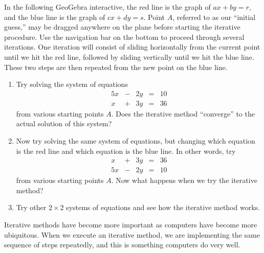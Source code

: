 \documentclass{ximera}
\begin{document}
\begin{exploration}\label{exp:gauss-seidel2x2}
In the following GeoGebra interactive, the red line is the graph of $ax+by=r$, and the blue line is the graph of $cx+dy=s$.  Point $A$, referred to as our ``initial guess,'' may be dragged anywhere on the plane before starting the iterative procedure.  Use the navigation bar on the bottom to proceed through several iterations.  One iteration will consist of sliding horizontally from the current point until we hit the red line, followed by sliding vertically until we hit the blue line.  These two steps are then repeated from the new point on the blue line.
    
    \begin{center}
\end{center}

    \begin{enumerate}
        \item Try solving the system of equations
\begin{equation}\label{eq:diagdom1}
\begin{array}{ccccc}
      5x& -&2y&=&10\\
      x & +&3y&= &36 
    \end{array}
\end{equation}
from various starting points $A$.  Does the iterative method ``converge'' to the actual solution of this system?
        \item Now try solving the same system of equations, but changing which equation is the red line and which equation is the blue line.  In other words, try
\begin{equation}\label{eq:diagdom2}
\begin{array}{ccccc}
      x & +&3y&= &36  \\
     5x& -&2y&=&10
    \end{array}
\end{equation}
from various starting points $A$.  Now what happens when we try the iterative method?
\item Try other $2 \times 2$ systems of equations and see how the iterative method works.
    \end{enumerate}
\end{exploration}

Iterative methods have become more important as computers have become more ubiquitous.  When we execute an iterative method, we are implementing the same sequence of steps repeatedly, and this is something computers do very well.
\end{document}
